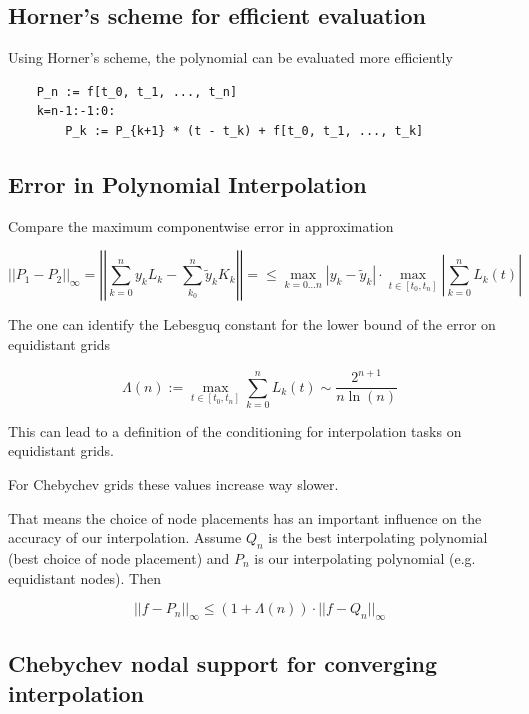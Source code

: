 \documentclass[
    a4paper,
    11pt
]{article}
\begin{document}
\subsection{Horner's scheme for efficient evaluation}

Using Horner's scheme, the polynomial can be evaluated more efficiently
\begin{verbatim}
    P_n := f[t_0, t_1, ..., t_n]
    k=n-1:-1:0:
        P_k := P_{k+1} * (t - t_k) + f[t_0, t_1, ..., t_k]
\end{verbatim}

\subsection{Error in Polynomial Interpolation}

Compare the maximum componentwise error in approximation

\begin{equation}
    ||P_1 - P_2||_{\infty} = \left|\left| \sum_{k=0}^n y_k L_k - \sum_{k_0}^n
    \tilde{y}_k K_k \right|\right| =
    \leq \max_{k=0 \dots n} | y_k - \tilde{y}_k| \cdot \max_{t \in [t_0, t_n]}
    \left| \sum_{k=0}^n L_k(t) \right|
\end{equation}

The one can identify the Lebesguq constant for the lower bound of the error on
equidistant grids

\begin{equation}
    \Lambda(n) := \max_{t \in [t_0, t_n]} \sum_{k=0}^n L_k(t)
    \sim \frac{2^{n+1}}{n \ln(n)}
\end{equation}

This can lead to a definition of the conditioning for interpolation tasks on
equidistant grids.

For Chebychev grids these values increase way slower.

That means the choice of node placements has an important influence on the
accuracy of our interpolation. Assume $Q_n$ is the best interpolating
polynomial (best choice of node placement) and $P_n$ is our interpolating
polynomial (e.g. equidistant nodes). Then

\begin{equation}
    ||f - P_n||_{\infty} \leq (1 + \Lambda(n)) \cdot ||f - Q_n||_{\infty}
\end{equation}


\subsection{Chebychev nodal support for converging interpolation}
\end{document}
